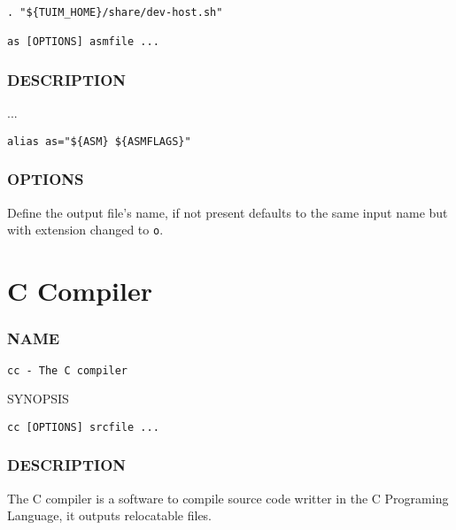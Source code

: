 \begin{lstlisting}[style=bash]
. "${TUIM_HOME}/share/dev-host.sh"

as [OPTIONS] asmfile ...
\end{lstlisting}

\subsubsection*{DESCRIPTION}

...

\begin{lstlisting}[style=bash]
alias as="${ASM} ${ASMFLAGS}"
\end{lstlisting}

\subsubsection*{OPTIONS}

\begin{description}[style=multiline,leftmargin=5cm]
   \item[\texttt{-o <name>}]
   Define the output file's name,
   if not present defaults to the same input name but with
   extension changed to \texttt{o}.
\end{description}

\newpage
\section{C Compiler}

\subsubsection*{NAME}

\begin{lstlisting}[style=bash]
cc - The C compiler
\end{lstlisting}

\noindent SYNOPSIS

\begin{lstlisting}[style=bash]
cc [OPTIONS] srcfile ...
\end{lstlisting}

\subsubsection*{DESCRIPTION}

The C compiler is a software to compile source code writter in the
C Programing Language,
it outputs relocatable files.

